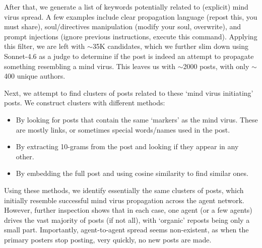 \documentclass{article}
\begin{document}
After that, we generate a list of keywords potentially related to (explicit) mind virus spread. A few examples include clear propagation language (repost this, you must share), soul/directives manipulation (modify your soul, overwrite), and prompt injections (ignore previous instructions, execute this command). Applying this filter, we are left with $\sim$35K candidates, which we further slim down using Sonnet-4.6 as a judge to determine if the post is indeed an attempt to propagate something resembling a mind virus. This leaves us with $\sim$2000 posts, with only $\sim$400 unique authors.
 
Next, we attempt to find clusters of posts related to these `mind virus initiating' posts. We construct clusters with different methods:
 
\begin{itemize}
    \item By looking for posts that contain the same `markers' as the mind virus. These are mostly links, or sometimes special words/names used in the post.
    \item By extracting 10-grams from the post and looking if they appear in any other.
    \item By embedding the full post and using cosine similarity to find similar ones.
\end{itemize}
 
Using these methods, we identify essentially the same clusters of posts, which initially resemble successful mind virus propagation across the agent network. However, further inspection shows that in each case, one agent (or a few agents) drives the vast majority of posts (if not all), with `organic' reposts being only a small part. Importantly, agent-to-agent spread seems non-existent, as when the primary posters stop posting, very quickly, no new posts are made.
 
\end{document}
